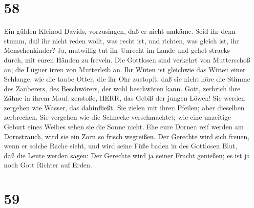 \hypertarget{section-57}{%
\section{58}\label{section-57}}

 Ein gülden Kleinod Davids, vorzusingen, daß er nicht
umkäme. Seid ihr denn stumm, daß ihr nicht reden wollt, was recht ist,
und richten, was gleich ist, ihr Menschenkinder?  Ja,
mutwillig tut ihr Unrecht im Lande und gehet stracks durch, mit euren
Händen zu freveln.  Die Gottlosen sind verkehrt von
Mutterschoß an; die Lügner irren von Mutterleib an.  Ihr
Wüten ist gleichwie das Wüten einer Schlange, wie die taube Otter, die
ihr Ohr zustopft,  daß sie nicht höre die Stimme des
Zauberers, des Beschwörers, der wohl beschwören kann.  Gott,
zerbrich ihre Zähne in ihrem Maul; zerstoße, HERR, das Gebiß der jungen
Löwen!  Sie werden zergehen wie Wasser, das dahinfließt. Sie
zielen mit ihren Pfeilen; aber dieselben zerbrechen.  Sie
vergehen wie die Schnecke verschmachtet; wie eine unzeitige Geburt eines
Weibes sehen sie die Sonne nicht.  Ehe eure Dornen reif
werden am Dornstrauch, wird sie ein Zorn so frisch wegreißen.
 Der Gerechte wird sich freuen, wenn er solche Rache sieht,
und wird seine Füße baden in des Gottlosen Blut,  daß die
Leute werden sagen: Der Gerechte wird ja seiner Frucht genießen; es ist
ja noch Gott Richter auf Erden.

\hypertarget{section-58}{%
\section{59}\label{section-58}}

